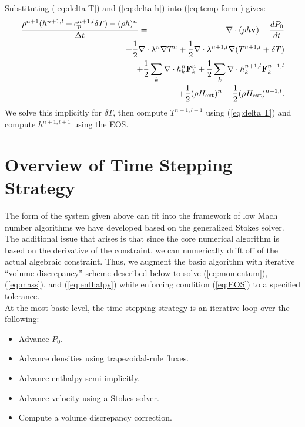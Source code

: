 \documentclass[final]{siamltex}
\def\Fb {{\bf F}}
\def\vb {{\bf v}}
\def\Hext {H_{\rm ext}}
\def\half   {\frac{1}{2}}
\begin{document}
Substituting (\ref{eq:delta T}) and (\ref{eq:delta h}) into (\ref{eq:temp form}) gives:
\begin{eqnarray}
\frac{\rho^{n+1}(h^{n+1,l} + c_p^{n+1,l}\delta T) - (\rho h)^n}{\Delta t} &=& -\nabla\cdot(\rho h\vb) + \frac{dP_0}{dt}\nonumber\\
&&\hspace{-0.5in}+ \half\nabla\cdot\lambda^n\nabla T^n + \half\nabla\cdot\lambda^{n+1,l}\nabla(T^{n+1,l} + \delta T)\nonumber\\
&&\hspace{-0.5in} + \half\sum_k\nabla\cdot h_k^n \Fb_k^n + \half\sum_k\nabla\cdot h_k^{n+1,l} \Fb_k^{n+1,l}\nonumber\\
&&\hspace{-0.5in} + \half(\rho\Hext)^n + \half(\rho\Hext)^{n+1,l}.
\end{eqnarray}
We solve this implicitly for $\delta T$, then compute $T^{n+1,l+1}$
using (\ref{eq:delta T}) and compute $h^{n+1,l+1}$ using the EOS.

\section{Overview of Time Stepping Strategy}

The form of the system given above can fit into the framework of low Mach number algorithms we have
developed based on the generalized Stokes solver. 
The additional issue that arises is that since the core numerical algorithm is based on the derivative
of the constraint, we can numerically drift off of the actual algebraic constraint. Thus, we augment the
basic algorithm with iterative 
``volume discrepancy'' scheme described below to solve 
(\ref{eq:momentum}), (\ref{eq:mass}), and (\ref{eq:enthalpy})
while enforcing condition (\ref{eq:EOS}) to a specified tolerance.\\

At the most basic level, the time-stepping strategy is an iterative loop over the following:\\
\begin{itemize}
\item Advance $P_0$.
\item Advance densities using trapezoidal-rule fluxes.
\item Advance enthalpy semi-implicitly.
\item Advance velocity using a Stokes solver.
\item Compute a volume discrepancy correction.
\end{itemize}
\end{document}
